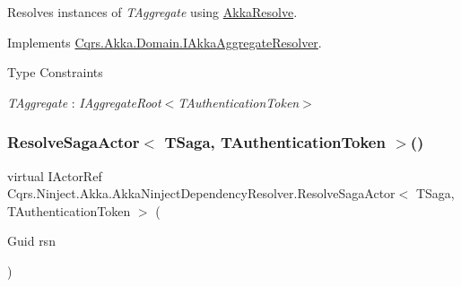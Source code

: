 Resolves instances of {\itshape T\+Aggregate}  using \hyperlink{classCqrs_1_1Ninject_1_1Akka_1_1AkkaNinjectDependencyResolver_a8e55618bf89a2c14bc3d0e7b3253f17d_a8e55618bf89a2c14bc3d0e7b3253f17d}{Akka\+Resolve}. 



Implements \hyperlink{interfaceCqrs_1_1Akka_1_1Domain_1_1IAkkaAggregateResolver_a59dbc788ce9893d72684ff5c18945c1d_a59dbc788ce9893d72684ff5c18945c1d}{Cqrs.\+Akka.\+Domain.\+I\+Akka\+Aggregate\+Resolver}.

\begin{Desc}
\item[Type Constraints]\begin{description}
\item[{\em T\+Aggregate} : {\em I\+Aggregate\+Root$<$T\+Authentication\+Token$>$}]\end{description}
\end{Desc}
\mbox{\label{classCqrs_1_1Ninject_1_1Akka_1_1AkkaNinjectDependencyResolver_a56da352a605155a1d6572ddb76d9ceea_a56da352a605155a1d6572ddb76d9ceea}} 
\subsubsection{\texorpdfstring{Resolve\+Saga\+Actor$<$ T\+Saga, T\+Authentication\+Token $>$()}{ResolveSagaActor< TSaga, TAuthenticationToken >()}}
{\footnotesize\ttfamily virtual I\+Actor\+Ref Cqrs.\+Ninject.\+Akka.\+Akka\+Ninject\+Dependency\+Resolver.\+Resolve\+Saga\+Actor$<$ T\+Saga, T\+Authentication\+Token $>$ (\begin{DoxyParamCaption}\item[{Guid}]{rsn }\end{DoxyParamCaption})\hspace{0.3cm}{\ttfamily [virtual]}}



